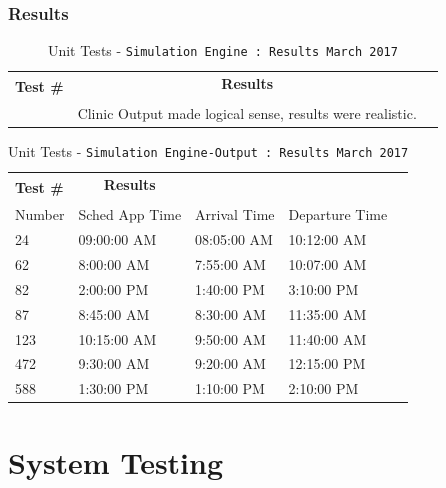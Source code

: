\documentclass[12pt]{article}
\newcounter{ResultCounter}
\begin{document}
\subsubsection{Results}
\begin{table}[H]
	\centering
	\caption{Unit Tests - \texttt{Simulation Engine : Results March 2017}}\label{HealthCareOutput_unit_results 1}
	\begin{tabular}{lll}
		\toprule
		\multirow{2}{*}{\bf Test \#}  & \multicolumn{1}{c}{\bf Results}\\
		\\\midrule
		{ResultCounter}\arabic{ResultCounter}\label{GetPoint_0} & Clinic Output made logical sense, results were realistic.\\
		\bottomrule
	\end{tabular}
\end{table}		
	
\begin{table}[H]
	\centering
	\caption{Unit Tests - \texttt{Simulation Engine-Output : Results March 2017}}\label{HealthCareOutput_unit_results 2}
	\begin{tabular}{lllll}
		\toprule
		\multirow{2}{*}{\bf Test \#}  & \multicolumn{1}{c}{\bf Results}\\
		\\\midrule
		Number & Sched App Time & Arrival Time & Departure Time \\
		\midrule
		24 & 09:00:00 AM & 08:05:00 AM & 10:12:00 AM \\
		62 & 8:00:00 AM	& 7:55:00 AM &10:07:00 AM \\
		82 & 2:00:00 PM	& 1:40:00 PM& 3:10:00 PM \\
		87&	8:45:00 AM&	8:30:00 AM&	11:35:00 AM\\
		123& 10:15:00 AM& 9:50:00 AM& 11:40:00 AM\\
		472& 9:30:00 AM& 9:20:00 AM& 12:15:00 PM\\
		588& 1:30:00 PM& 1:10:00 PM& 2:10:00 PM\\
		\bottomrule
	\end{tabular}
\end{table}		


\section{System Testing}
\end{document}
